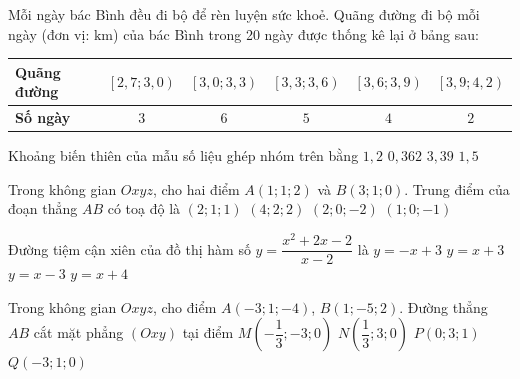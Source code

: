 \documentclass[12pt,a4paper]{article}
\begin{document}
\begin{ex}
	Mỗi ngày bác Bình đều đi bộ để rèn luyện sức khoẻ. Quãng đường đi bộ mỗi ngày (đơn vị: $\text{km}$) của bác Bình trong 20 ngày được thống kê lại ở bảng sau:
	\begin{center}
		\begin{tabular}{|l|c|c|c|c|c|}
			\hline
			\textbf{Quãng đường} & $\left[2{,}7; 3{,}0\right)$ & $\left[3{,}0; 3{,}3\right)$ & $\left[3{,}3; 3{,}6\right)$ & $\left[3{,}6; 3{,}9\right)$ & $\left[3{,}9; 4{,}2\right)$ \\
			\hline
			\textbf{Số ngày} & $3$ & $6$ & $5$ & $4$ & $2$ \\
			\hline
		\end{tabular}
	\end{center}
	Khoảng biến thiên của mẫu số liệu ghép nhóm trên bằng
	\choice
	{$1{,}2$}
	{$0{,}362$}
	{$3{,}39$}
	{\True $1{,}5$}
	\loigiai{}
\end{ex}

\begin{ex}
	Trong không gian $Oxyz$, cho hai điểm $A(1; 1; 2)$ và $B(3; 1; 0)$. Trung điểm của đoạn thẳng $AB$ có toạ độ là
	\choice
	{\True $(2; 1; 1)$}
	{$(4; 2; 2)$}
	{$(2; 0; -2)$}
	{$(1; 0; -1)$}
	\loigiai{}
\end{ex}

\begin{ex}
	Đường tiệm cận xiên của đồ thị hàm số $y = \dfrac{x^2 + 2x - 2}{x - 2}$ là
	\choice
	{$y = -x + 3$}
	{$y = x + 3$}
	{$y = x - 3$}
	{\True $y = x + 4$}
	\loigiai{}
\end{ex}

\begin{ex}
	Trong không gian $Oxyz$, cho điểm $A(-3; 1; -4)$, $B(1; -5; 2)$. Đường thẳng $AB$ cắt mặt phẳng $(Oxy)$ tại điểm
	\choice
	{\True $M\left(-\dfrac{1}{3}; -3; 0\right)$}
	{$N\left(\dfrac{1}{3}; 3; 0\right)$}
	{$P(0; 3; 1)$}
	{$Q(-3; 1; 0)$}
	\loigiai{}
\end{ex}

\begin{flushleft}
	{\color{blue!50!green}}
\end{flushleft}
\setcounter{ex}{0}
\setcounter{bt}{0}
\end{document}
